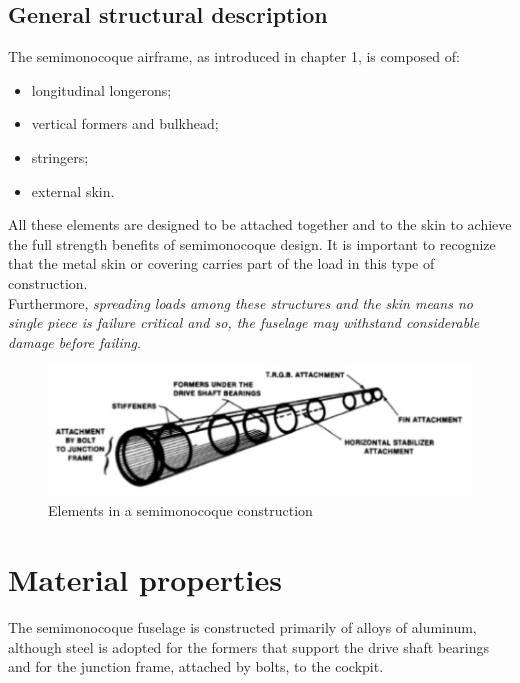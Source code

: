 \subsection*{General structural description}
\noindent
The semimonocoque airframe, as introduced in chapter 1, is composed of:
\begin{itemize}
	\item longitudinal longerons;
	\item vertical formers and bulkhead; 	
	\item stringers;
	\item external skin.
\end{itemize}

\noindent
All these elements are designed to be attached together and to the skin to achieve the full strength benefits of semimonocoque design. It is important to recognize that the metal skin or covering carries
part of the load in this type of construction. \\
Furthermore, \emph{spreading loads among these structures and the skin means no single piece is failure critical and so, the fuselage may withstand considerable damage before failing}. \\

\begin{figure}[h!]
	\begin{center}
		\centering  		 		
		\includegraphics[width=0.9\linewidth]{PICTURES/3_Ecureuil/semimonocoque2}
	\end{center}
	\caption{Elements in a semimonocoque construction}
\end{figure}	



\section*{Material properties}
\noindent
The semimonocoque fuselage is constructed primarily of alloys of aluminum, although steel is adopted for the formers that support the drive shaft bearings and for the junction frame, attached by bolts, to the cockpit.

